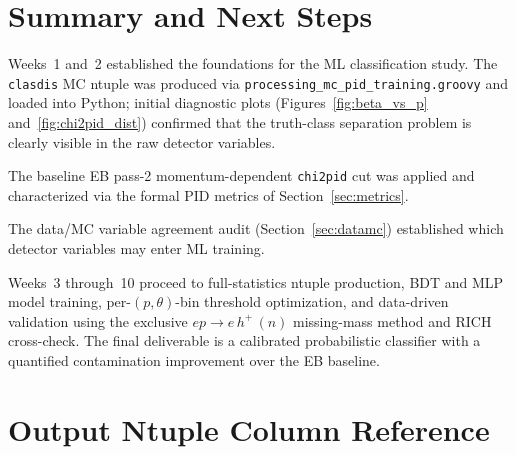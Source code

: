\documentclass[11pt]{article}
\begin{document}

\section{Summary and Next Steps}
\label{sec:summary}

Weeks~1 and~2 established the foundations for the ML classification study.
The \texttt{clasdis} MC ntuple was produced via
\texttt{processing\_mc\_pid\_training.groovy} and loaded into Python;
initial diagnostic plots (Figures~\ref{fig:beta_vs_p}
and~\ref{fig:chi2pid_dist}) confirmed that the truth-class separation problem
is clearly visible in the raw detector variables.

The baseline EB pass-2 momentum-dependent \texttt{chi2pid} cut was applied and
characterized via the formal PID metrics of Section~\ref{sec:metrics}.

The data/MC variable agreement audit (Section~\ref{sec:datamc}) established
which detector variables may enter ML training.

Weeks~3 through~10 proceed to full-statistics ntuple production, BDT and MLP
model training, per-$(p,\theta)$-bin threshold optimization, and data-driven
validation using the exclusive $ep \to e\,h^+\,(n)$ missing-mass method and
RICH cross-check.
The final deliverable is a calibrated probabilistic classifier with a
quantified contamination improvement over the EB baseline.

\appendix
\section{Output Ntuple Column Reference}
\label{app:columns}
\end{document}
